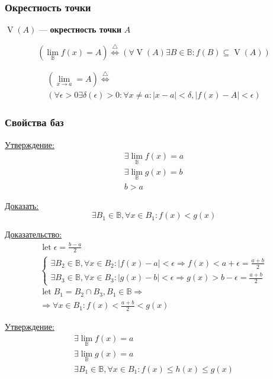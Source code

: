 \documentclass{article}
\DeclareMathOperator*{\Let}{let}
\DeclareMathOperator*{\V}{V}
\begin{document}
\subsubsection{Окрестность точки}

$\V(A)$ --- \textbf{окрестность точки} $A$

\[ (\lim_{\mathbb{B}} f(x) = A) \stackrel{\triangle}{\Leftrightarrow}
(\forall \V(A) \exists B \in \mathbb{B} : f(B) \subseteq \V(A)) \]

\begin{gather*}
	(\lim_{x \to a} = A) \stackrel{\triangle}{\Leftrightarrow} \\
	(\forall \epsilon > 0 \exists \delta(\epsilon) > 0 : \forall x \ne a : |x - a| < \delta, |f(x) - A| < \epsilon)
\end{gather*}

\subsubsection{Свойства баз}

\underline{Утверждение:}
\begin{gather*}
	\exists \lim_{\mathbb{B}} f(x) = a \\
	\exists \lim_{\mathbb{B}} g(x) = b \\
	b > a
\end{gather*}

\underline{Доказать:}
\[
\exists B_1 \in \mathbb{B}, \forall x \in B_1 : f(x) < g(x)
\]

\underline{Доказательство:}
\begin{gather*}
	\Let \epsilon = \frac{b - a}{2} \\
	\begin{cases}
		\exists B_2 \in \mathbb{B}, \forall x \in B_2 : |f(x) - a| < \epsilon \Rightarrow
		f(x) < a + \epsilon = \frac{a + b}{2} \\
		\exists B_3 \in \mathbb{B}, \forall x \in B_3 : |g(x) - b| < \epsilon \Rightarrow
		g(x) > b - \epsilon = \frac{a + b}{2}
	\end{cases} \\
	\Let B_1 = B_2 \cap B_3, B_1 \in \mathbb{B} \Rightarrow \\
	\Rightarrow \forall x \in B_1 : f(x) < \frac{a + b}{2} < g(x)
\end{gather*}


\underline{Утверждение:}
\begin{gather*}
	\exists \lim_{\mathbb{B}} f(x) = a \\
	\exists \lim_{\mathbb{B}} g(x) = a \\
	\exists B_1 \in \mathbb{B}, \forall x \in B_1 : f(x) \le h(x) \le g(x)
\end{gather*}
\end{document}
